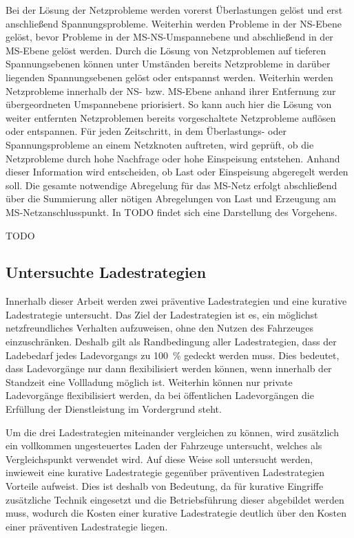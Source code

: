 Bei der Lösung der Netzprobleme werden vorerst Überlastungen gelöst und erst anschließend Spannungsprobleme.
Weiterhin werden Probleme in der \gls{NS}-Ebene gelöst, bevor Probleme in der \gls{MS}-\gls{NS}-Umspannebene und abschließend in der \gls{MS}-Ebene gelöst werden.
Durch die Lösung von Netzproblemen auf tieferen Spannungsebenen können unter Umständen bereits Netzprobleme in darüber liegenden Spannungsebenen gelöst oder entspannst werden.
Weiterhin werden Netzprobleme innerhalb der \gls{NS}- bzw. \gls{MS}-Ebene anhand ihrer Entfernung zur übergeordneten Umspannebene priorisiert.
So kann auch hier die Lösung von weiter entfernten Netzproblemen bereits vorgeschaltete Netzprobleme auflösen oder entspannen.
Für jeden Zeitschritt, in dem Überlastungs- oder Spannungsprobleme an einem Netzknoten auftreten, wird geprüft, ob die Netzprobleme durch hohe Nachfrage oder hohe Einspeisung entstehen.
Anhand dieser Information wird entscheiden, ob Last oder Einspeisung abgeregelt werden soll.
Die gesamte notwendige Abregelung für das \gls{MS}-Netz erfolgt abschließend über die Summierung aller nötigen Abregelungen von Last und Erzeugung am \gls{MS}-Netzanschlusspunkt.
In {\color{red} TODO} findet sich eine Darstellung des Vorgehens.

{\color{red} TODO}


\subsection{Untersuchte Ladestrategien}

Innerhalb dieser Arbeit werden zwei präventive Ladestrategien und eine kurative Ladestrategie untersucht.
Das Ziel der Ladestrategien ist es, ein möglichst netzfreundliches Verhalten aufzuweisen, ohne den Nutzen des Fahrzeuges einzuschränken.
Deshalb gilt als Randbedingung aller Ladestrategien, dass der Ladebedarf jedes Ladevorgangs zu \SI{100}{\percent} gedeckt werden muss.
Dies bedeutet, dass Ladevorgänge nur dann flexibilisiert werden können, wenn innerhalb der Standzeit eine Vollladung möglich ist.
Weiterhin können nur private Ladevorgänge flexibilisiert werden, da bei öffentlichen Ladevorgängen die Erfüllung der Dienstleistung im Vordergrund steht.\medskip

Um die drei Ladestrategien miteinander vergleichen zu können, wird zusätzlich ein vollkommen ungesteuertes Laden der Fahrzeuge untersucht, welches als Vergleichspunkt verwendet wird.
Auf diese Weise soll untersucht werden, inwieweit eine kurative Ladestrategie gegenüber präventiven Ladestrategien Vorteile aufweist.
Dies ist deshalb von Bedeutung, da für kurative Eingriffe zusätzliche Technik eingesetzt und die  Betriebsführung dieser abgebildet werden muss, wodurch die Kosten einer kurative Ladestrategie deutlich über den Kosten einer präventiven Ladestrategie liegen.


